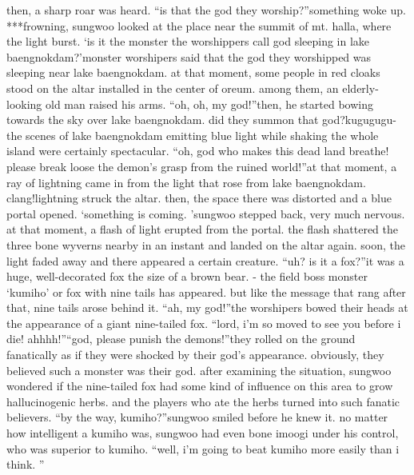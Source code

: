 then, a sharp roar was heard.
“is that the god they worship?”something woke up.
***frowning, sungwoo looked at the place near the summit of mt.
 halla, where the light burst.
‘is it the monster the worshippers call god sleeping in lake baengnokdam?’monster worshipers said that the god they worshipped was sleeping near lake baengnokdam.
at that moment, some people in red cloaks stood on the altar installed in the center of oreum.
among them, an elderly-looking old man raised his arms.
“oh, oh, my god!”then, he started bowing towards the sky over lake baengnokdam.
 did they summon that god?kugugugu-the scenes of lake baengnokdam emitting blue light while shaking the whole island were certainly spectacular.
“oh, god who makes this dead land breathe! please break loose the demon’s grasp from the ruined world!”at that moment, a ray of lightning came in from the light that rose from lake baengnokdam.
clang!lightning struck the altar.
 then, the space there was distorted and a blue portal opened.
‘something is coming.
’sungwoo stepped back, very much nervous.
 at that moment, a flash of light erupted from the portal.
 the flash shattered the three bone wyverns nearby in an instant and landed on the altar again.
 soon, the light faded away and there appeared a certain creature.
“uh? is it a fox?”it was a huge, well-decorated fox the size of a brown bear.
- the field boss monster ‘kumiho’ or fox with nine tails has appeared.
but like the message that rang after that, nine tails arose behind it.
“ah, my god!”the worshipers bowed their heads at the appearance of a giant nine-tailed fox.
“lord, i’m so moved to see you before i die! ahhhh!”“god, please punish the demons!”they rolled on the ground fanatically as if they were shocked by their god’s appearance.
obviously, they believed such a monster was their god.
after examining the situation, sungwoo wondered if the nine-tailed fox had some kind of influence on this area to grow hallucinogenic herbs.
 and the players who ate the herbs turned into such fanatic believers.
“by the way, kumiho?”sungwoo smiled before he knew it.
no matter how intelligent a kumiho was, sungwoo had even bone imoogi under his control, who was superior to kumiho.
“well, i’m going to beat kumiho more easily than i think.
”

